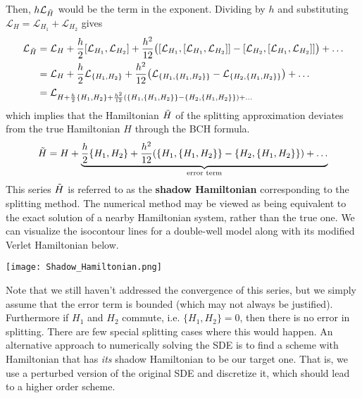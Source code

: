 \documentclass{article}
\theoremstyle{remark}
\theoremstyle{definition}
\begin{document}
Then, $h \mathcal{L}_{\Tilde{H}}$ would be the term in the exponent. Dividing by $h$ and substituting $\mathcal{L}_H = \mathcal{L}_{H_1} + \mathcal{L}_{H_2}$ gives 
\begin{align*}
    \mathcal{L}_{\Tilde{H}} & = \mathcal{L}_H + \frac{h}{2} [\mathcal{L}_{H_1}, \mathcal{L}_{H_2}] + \frac{h^2}{12} \big( [\mathcal{L}_{H_1}, [\mathcal{L}_{H_1}, \mathcal{L}_{H_2}]] - [\mathcal{L}_{H_2}, [\mathcal{L}_{H_1}, \mathcal{L}_{H_2}]] \big) + \ldots \\
    & = \mathcal{L}_H + \frac{h}{2} \mathcal{L}_{\{H_1, H_2\}} + \frac{h^2}{12} \big( \mathcal{L}_{\{H_1, \{H_1, H_2\}\}} - \mathcal{L}_{\{H_2, \{H_1, H_2\}\}} \big) + \ldots \\
    & = \mathcal{L}_{H + \frac{h}{2} \{H_1, H_2\} + \frac{h^2}{12} (\{ H_1, \{H_1, H_2\}\} - \{H_2, \{H_1, H_2\}\}) + \ldots} 
\end{align*}
which implies that the Hamiltonian $\Tilde{H}$ of the splitting approximation deviates from the true Hamiltonian $H$ through the BCH formula. 
\[\Tilde{H} = H + \underbrace{\frac{h}{2} \{H_1, H_2\} + \frac{h^2}{12} (\{ H_1, \{H_1, H_2\}\} - \{H_2, \{H_1, H_2\}\}) + \ldots}_{\text{error term}}\]
This series $\Tilde{H}$ is referred to as the \textbf{shadow Hamiltonian} corresponding to the splitting method. The numerical method may be viewed as being equivalent to the exact solution of a nearby Hamiltonian system, rather than the true one. We can visualize the isocontour lines for a double-well model along with its modified Verlet Hamiltonian below. 
\begin{center}
    \texttt{[image: Shadow\_Hamiltonian.png]}
\end{center}
Note that we still haven't addressed the convergence of this series, but we simply assume that the error term is bounded (which may not always be justified). Furthermore if $H_1$ and $H_2$ commute, i.e. $\{H_1, H_2\} = 0$, then there is no error in splitting. There are few special splitting cases where this would happen. An alternative approach to numerically solving the SDE is to find a scheme with Hamiltonian that has \textit{its} shadow Hamiltonian to be our target one. That is, we use a perturbed version of the original SDE and discretize it, which should lead to a higher order scheme. 
\end{document}
